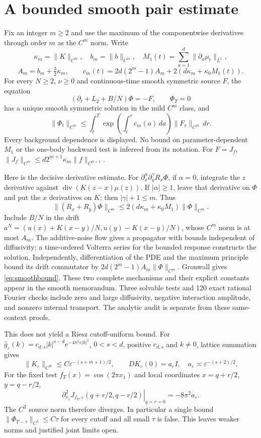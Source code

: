 \documentclass[11pt]{article}
\begin{document}
\section{A bounded smooth pair estimate}
Fix an integer $m\ge2$ and use the maximum of the componentwise derivatives
through order $m$ as the $C^m$ norm. Write
\[
 \kappa_m=\|K\|_{C^m},\quad b_m=\|b\|_{C^m},\quad
 M_1(t)=\sum_{a=1}^d\|\partial_a\mu_t\|_{L^1},
\]
\[
 A_m=b_m+\tfrac32\kappa_m,\qquad
 c_m(t)=2d(2^m-1)A_m+2(d\kappa_m+\kappa_0M_1(t)).
\]
For every $N\ge2$, $\nu\ge0$ and continuous-time smooth symmetric source
$F$, the equation
\[
 (\partial_t+L_2+B/N)\Phi=-F,\qquad \Phi_T=0
\]
has a unique smooth symmetric solution in the mild $C^m$ class, and
\begin{equation}\label{eq:smoothbound}
 \|\Phi_t\|_{C^m}\le\int_t^T
   \exp\left(\int_t^r c_m(a)\,da\right)\|F_r\|_{C^m}\,dr.
\end{equation}
Every background dependence is displayed. No bound on parameter-dependent
$M_1$ or the one-body backward test is inferred from its notation.
For $F=J_f$,
$\|J_f\|_{C^m}\le d2^{m+1}\kappa_m\|f\|_{C^{m+1}}$.

Here is the decisive derivative estimate. For $\partial_x^\alpha
\partial_y^\gamma R_x\Phi$, if $\alpha=0$, integrate the $z$ derivative
against $\operatorname{div}(K(z-x)\mu(z))$. If $|\alpha|\ge1$, leave
that derivative on $\Phi$ and put the $x$ derivatives on $K$; then
$|\gamma|+1\le m$. Thus
\[
 \|(R_x+R_y)\Phi\|_{C^m}
 \le2(d\kappa_m+\kappa_0M_1)\|\Phi\|_{C^m}.
\]
Include $B/N$ in the drift
$a^N=(u(x)+K(x-y)/N,u(y)-K(x-y)/N)$, whose $C^m$ norm is at most
$A_m$. The additive-noise flow gives a propagator with bounds independent
of diffusivity; a time-ordered Volterra series for the bounded response
constructs the solution. Independently, differentiation of the PDE and
the maximum principle bound its drift commutator by
$2d(2^m-1)A_m\|\Phi\|_{C^m}$. Gronwall gives
\eqref{eq:smoothbound}. These two complete mechanisms and their explicit
constants appear in the smooth memorandum. Three solvable tests and
120 exact rational Fourier checks include zero and large diffusivity,
negative interaction amplitude, and nonzero internal transport.
The analytic audit is separate from these same-context proofs.

This does not yield a Riesz cutoff-uniform bound. For
$\widehat g_\varepsilon(k)=c_{d,s}|k|^{s-d}e^{-4\pi^2\varepsilon|k|^2}$,
$0<s<d$, positive $c_{d,s}$ and $k\ne0$, lattice summation gives
\[
 \|K_\varepsilon\|_{C^m}\le C\varepsilon^{-(s+m+1)/2},\qquad
 DK_\varepsilon(0)=a_\varepsilon I,\quad
 a_\varepsilon\asymp\varepsilon^{-(s+2)/2}.
\]
For the fixed test $f_T(x)=\cos(2\pi x_1)$ and local coordinates
$x=q+r/2$, $y=q-r/2$,
\[
 \left.\partial_{r_1}^2J_{f_T,\varepsilon}(q+r/2,q-r/2)
 \right|_{q=r=0}=-8\pi^2a_\varepsilon.
\]
The $C^2$ source norm therefore diverges. In particular a single bound
$\|\Phi_{T-\tau}\|_{C^2}\le C\tau$ for every cutoff and all small
$\tau$ is false. This leaves weaker norms and justified joint limits open.
\end{document}
